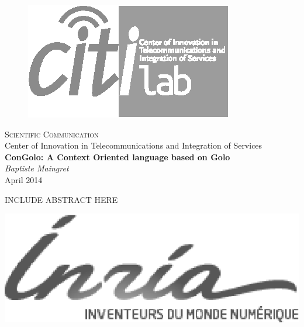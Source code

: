 \documentclass[a4paper]{article}
\begin{document}
%
%

\pagestyle{empty}
\begin{center}
\begin{figure}%
\centering
\includegraphics[width=0.4\columnwidth]{logo/citi-new-title-bw.eps}%
\end{figure}
{\LARGE \textsc{Scientific Communication}} \\ %
\vspace{0.5cm}
{Center of Innovation in Telecommunications and Integration of Services} \\ %
\vspace{2cm}
{\Large \textbf{ConGolo: A Context Oriented language based on Golo}} \\
\vspace{10pt}
{\large \textit{Baptiste Maingret}} \\
\vspace{10pt}
{\large April 2014} \\
\vspace{20pt}
\begin{minipage}{0.8\columnwidth}
\sffamily
\small
INCLUDE ABSTRACT HERE
\end{minipage}
\end{center}
\vfill
\begin{minipage}[b]{0.3\columnwidth}
\includegraphics[width=\columnwidth]{logo/inria.eps}%
\end{minipage}
\end{document}
